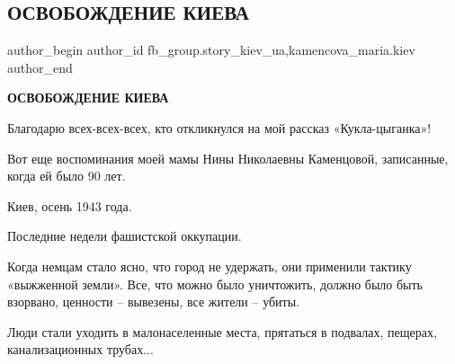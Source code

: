  
 
 
 
 
 
\subsection{ОСВОБОЖДЕНИЕ КИЕВА}
\label{sec:27_01_2021.fb.fb_group.story_kiev_ua.1.osvobozhdenie_kieva}
 
\ifcmt
 author_begin
   author_id fb_group.story_kiev_ua,kamencova_maria.kiev
 author_end
\fi

\textbf{ОСВОБОЖДЕНИЕ КИЕВА}

Благодарю всех-всех-всех, кто откликнулся на мой рассказ «Кукла-цыганка»!

Вот еще воспоминания моей мамы Нины Николаевны Каменцовой, записанные, когда ей
было 90 лет.

Киев, осень 1943 года.

Последние недели фашистской оккупации.

Когда немцам стало ясно, что город не удержать, они применили тактику
«выжженной земли». Все, что можно было уничтожить, должно было быть взорвано,
ценности – вывезены, все жители – убиты.

Люди стали уходить в малонаселенные места, прятаться в подвалах, пещерах,
канализационных трубах...

\raggedcolumns
\begin{multicols}{3} %
\setlength{\parindent}{0pt}




\end{multicols} %

